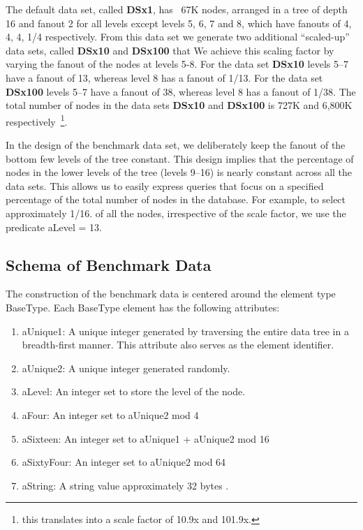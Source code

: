 The default data set, called {\bf DSx1}, has ~67K nodes, arranged in a
tree of depth 16 and fanout 2 for all  \new{} levels except levels 5, 6, 7
and 8, which have fanouts of 4, 4, 4, 1/4 respectively. From this data set we
generate two additional ``scaled-up'' data sets, called {\bf DSx10}
and {\bf DSx100} that    We achieve this scaling factor
by varying the fanout of the nodes at levels 5-8. For the data set
{\bf DSx10} levels 5--7 have a fanout of 13, whereas level 8 has a
fanout of 1/13. For the data set {\bf DSx100} levels 5--7 have a
fanout of 38, whereas level 8 has a fanout of 1/38. The total number
of nodes in the data sets {\bf DSx10} and {\bf DSx100} is 727K and
6,800K respectively~\footnote{this translates into a scale factor of 10.9x and
101.9x.}.

In the design of the benchmark data set, we deliberately  \new{} keep
the fanout of the bottom few levels of the tree constant.  This design
implies that the percentage of nodes in the lower levels of the tree
(levels 9--16) is nearly constant across all the data sets. This
allows us to easily express queries that focus on a specified
percentage of the total number of nodes in the database. For example,
to select approximately 1/16. of all the nodes, irrespective of the
scale factor, we use the predicate {\sf aLevel = 13}.

\subsection{Schema of Benchmark Data}
\label{sec:bench-data}
The construction of the benchmark data is centered around the element
type {\sf BaseType}. Each {\sf BaseType} element has the following
attributes:
\begin {enumerate}
\item {\sf aUnique1}: A unique integer generated by traversing
the entire data tree in a breadth-first manner.  This attribute also
serves as the element identifier.
\item {\sf aUnique2}: A unique integer generated randomly.
\item {\sf aLevel}: An integer set to store the level of the node.
\item {\sf aFour}: An integer set to {\sf aUnique2} mod 4
\item {\sf aSixteen}: An integer set to {\sf aUnique1 + aUnique2} mod 16
\item {\sf aSixtyFour}: An integer set to {\sf aUnique2} mod 64
\item {\sf aString}: A string value approximately 32 bytes  \new{}.
\end {enumerate}

